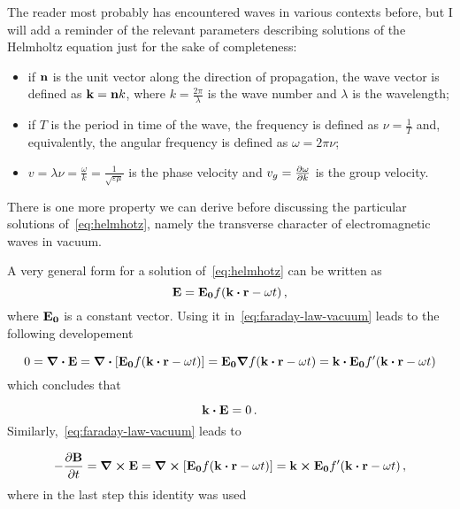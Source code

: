 \documentclass[12pt, class=report, crop=false]{standalone}
\begin{document}
\par
The reader most probably has encountered waves in various contexts before, but I will add a reminder of the relevant parameters describing solutions of the Helmholtz equation just for the sake of completeness:

\begin{itemize}
  \item if \(\vb{n}\) is the unit vector along the direction of propagation, the wave vector is defined as \(\vb{k}=\vb{n} k \), where \( k =\frac{2\pi}{\lambda}\) is the wave number and \(\lambda\) is the wavelength;
  \item if \(T\) is the period in time of the wave, the frequency is defined as \(\nu = \frac{1}{T}\) and, equivalently, the angular frequency is defined as \(\omega  = 2\pi \nu\);
  \item \(v=\lambda\nu=\frac{\omega}{k}= \frac{1}{\sqrt{\varepsilon\mu}}\) is the phase velocity and \(v_g = \pdv{\omega}{k}\) is the group velocity.
\end{itemize}

\par
There is one more property we can derive before discussing the particular solutions of~\cref{eq:helmhotz}, namely the transverse character of electromagnetic waves in vacuum.

\par
A very general form for a solution of~\cref{eq:helmhotz} can be written as
\begin{equation*}
  \vb{E} = \vb{E_0} f(\vb{k}\vdot\vb{r} -\omega t) \,,
\end{equation*}
where \(\vb{E_0}\) is a constant vector.
Using it in~\cref{eq:faraday-law-vacuum} leads to the following developement

\begin{equation*}
  0 = \div{\vb{E}} = \div{\left[\vb{E_0} f(\vb{k}\vdot\vb{r} -\omega t) \right]} = \vb{E_0} \grad{f(\vb{k}\vdot\vb{r} -\omega t)} = \vb{k}\vdot\vb{E_0} f'(\vb{k}\vdot\vb{r} -\omega t)
\end{equation*}
which concludes that

\begin{equation}
  \label{rez:1}
  \vb{k}\vdot\vb{E} = 0 \,.
\end{equation}
Similarly,~\cref{eq:faraday-law-vacuum} leads to

\begin{equation*}
  - \pdv{\vb{B}}{t}  = \curl{\vb{E}} = \curl{\left[\vb{E_0} f(\vb{k}\vdot\vb{r} -\omega t) \right]} = \vb{k}\cp \vb{E_0} f'(\vb{k}\vdot\vb{r} -\omega t) \, ,
\end{equation*}
where in the last step this identity was used
\end{document}
